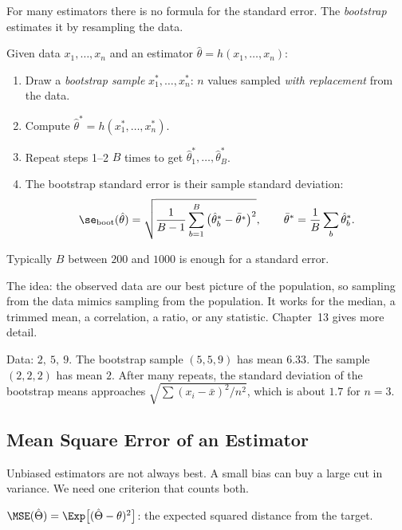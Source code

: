 For many estimators there is no formula for the standard error. The \emph{bootstrap} estimates it by resampling the data.

\begin{definition}
Given data $x_1,\dots,x_n$ and an estimator $\hat\theta=h(x_1,\dots,x_n)$:
\begin{enumerate}[label=(\arabic*)]
  \item Draw a \emph{bootstrap sample} $x_1^*,\dots,x_n^*$: $n$ values sampled \emph{with replacement} from the data.
  \item Compute $\hat\theta^*=h(x_1^*,\dots,x_n^*)$.
  \item Repeat steps 1--2 $B$ times to get $\hat\theta^*_1,\dots,\hat\theta^*_B$.
  \item The bootstrap standard error is their sample standard deviation:
  \[ \se_{\mathrm{boot}}(\hat\theta)=\sqrt{\frac1{B-1}\sum_{b=1}^B\big(\hat\theta^*_b-\bar{\theta}^*\big)^2},\qquad\bar{\theta}^*=\frac1B\sum_b\hat\theta^*_b. \]
\end{enumerate}
Typically $B$ between $200$ and $1000$ is enough for a standard error.
\end{definition}

The idea: the observed data are our best picture of the population, so sampling from the data mimics sampling from the population. It works for the median, a trimmed mean, a correlation, a ratio, or any statistic. Chapter~13 gives more detail.

\begin{example}
Data: $2,\ 5,\ 9$. The bootstrap sample $(5,5,9)$ has mean $6.33$. The sample $(2,2,2)$ has mean $2$. After many repeats, the standard deviation of the bootstrap means approaches $\sqrt{\sum(x_i-\bar{x})^2/n^2}$, which is about $1.7$ for $n=3$.
\end{example}

\subsection{Mean Square Error of an Estimator}\label{sec:mse}

Unbiased estimators are not always best. A small bias can buy a large cut in variance. We need one criterion that counts both.

\begin{definition}
$\MSE(\hat\Theta)=\Exp\big[(\hat\Theta-\theta)^2\big]$: the expected squared distance from the target.
\end{definition}

